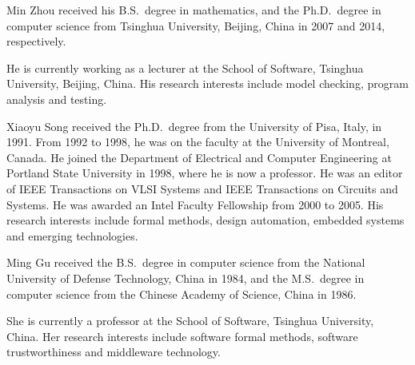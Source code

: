 \documentclass[journal]{IEEEtranTIE}
\begin{document}
\vspace{-5mm}
\begin{IEEEbiography}%
{Min Zhou} received his B.S.\ degree in mathematics, and the
Ph.D.\ degree in computer science from Tsinghua University, Beijing,
China in 2007 and 2014, respectively.

He is currently working as a lecturer at the School of Software,
Tsinghua University, Beijing, China. His research interests include
model checking, program analysis and testing.
\end{IEEEbiography}

\vspace{-5mm}
\begin{IEEEbiography}%
{Xiaoyu Song} received the Ph.D.\ degree from the University of Pisa,
Italy, in 1991. From 1992 to 1998, he was on the faculty at the
University of Montreal, Canada. He joined the Department of Electrical
and Computer Engineering at Portland State University in 1998, where
he is now a professor. He was an editor of IEEE Transactions on VLSI
Systems and IEEE Transactions on Circuits and Systems. He was awarded
an Intel Faculty Fellowship from 2000 to 2005. His research interests
include formal methods, design automation, embedded systems and
emerging technologies.
\end{IEEEbiography}

\vspace{-5mm}
\begin{IEEEbiography}%
{Ming Gu} received the B.S.\ degree in computer science from the
National University of Defense Technology, China in 1984, and the
M.S.\ degree in computer science from the Chinese Academy of Science,
China in 1986.
 
She is currently a professor at the School of Software, Tsinghua
University, China.  Her research interests include software formal
methods, software trustworthiness and middleware technology.
\end{IEEEbiography}
\end{document}
